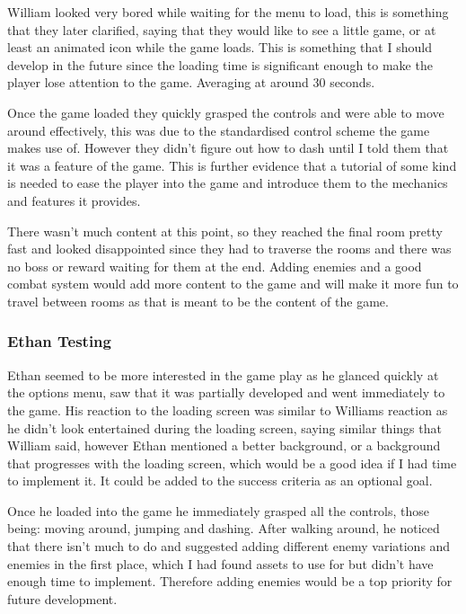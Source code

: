 \documentclass{article}
\newcommand{\parBr}{\vspace{5mm}}%
\begin{document}
William looked very bored while waiting for the menu to load, this is something that they later clarified, saying that they would like to see a little game, or at least an animated icon while the game loads. This is something that I should develop in the future since the loading time is significant enough to make the player lose attention to the game. Averaging at around 30 seconds.

\parBr

Once the game loaded they quickly grasped the controls and were able to move around effectively, this was due to the standardised control scheme the game makes use of. However they didn't figure out how to dash until I told them that it was a feature of the game. This is further evidence that a tutorial of some kind is needed to ease the player into the game and introduce them to the mechanics and features it provides.

\parBr

There wasn't much content at this point, so they reached the final room pretty fast and looked disappointed since they had to traverse the rooms and there was no boss or reward waiting for them at the end. Adding enemies and a good combat system would add more content to the game and will make it more fun to travel between rooms as that is meant to be the content of the game.

\subsubsection{Ethan Testing}
Ethan seemed to be more interested in the game play as he glanced quickly at the options menu, saw that it was partially developed and went immediately to the game. His reaction to the loading screen was similar to Williams reaction as he didn't look entertained during the loading screen, saying similar things that William said, however Ethan mentioned a better background, or a background that progresses with the loading screen, which would be a good idea if I had time to implement it. It could be added to the success criteria as an optional goal.

\parBr

Once he loaded into the game he immediately grasped all the controls, those being: moving around, jumping and dashing. After walking around, he noticed that there isn't much to do and suggested adding different enemy variations and enemies in the first place, which I had found assets to use for but didn't have enough time to implement. Therefore adding enemies would be a top priority for future development. 
\end{document}
